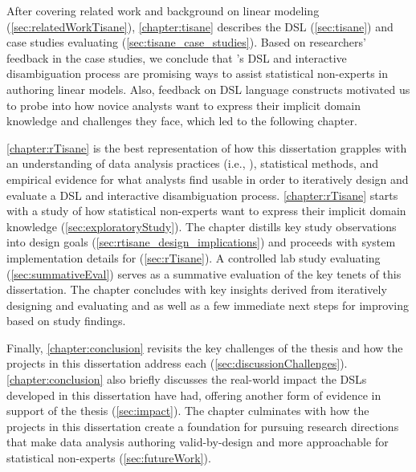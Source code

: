 After covering related work and background on linear modeling
(\autoref{sec:relatedWorkTisane}), \autoref{chapter:tisane} describes the
\tisane DSL (\autoref{sec:tisane}) and case studies evaluating \tisane
(\autoref{sec:tisane_case_studies}). Based on researchers' feedback in the case
studies, we conclude that \tisane's DSL and interactive disambiguation process
are promising ways to assist statistical non-experts in authoring linear models.
Also, feedback on DSL language constructs motivated us to probe into how novice
analysts want to express their implicit domain knowledge and challenges they
face, which led to the following chapter.

\autoref{chapter:rTisane} is the best representation of how this dissertation
grapples with an understanding of data analysis practices (i.e., \hypoForm),
statistical methods, and empirical evidence for what analysts find usable in
order to iteratively design and evaluate a DSL and interactive disambiguation
process. \autoref{chapter:rTisane} starts with a study of how statistical
non-experts want to express their implicit domain knowledge
(\autoref{sec:exploratoryStudy}). The chapter distills key study observations
into design goals (\autoref{sec:rtisane_design_implications}) and proceeds with
system implementation details for \rTisane (\autoref{sec:rTisane}). A controlled
lab study evaluating \rTisane (\autoref{sec:summativeEval}) serves as a
summative evaluation of the key tenets of this dissertation. The chapter
concludes with key insights derived from iteratively designing and evaluating
\tisane and \rTisane as well as a few immediate next steps for improving
\rTisane based on study findings.


Finally, \autoref{chapter:conclusion} revisits the key challenges of the thesis
and how the projects in this dissertation address each
(\autoref{sec:discussionChallenges}). \autoref{chapter:conclusion} also briefly
discusses the real-world impact the DSLs developed in this dissertation have
had, offering another form of evidence in support of the thesis
(\autoref{sec:impact}). The chapter culminates with how the projects in this
dissertation create a foundation for pursuing research directions that make data
analysis authoring valid-by-design and more approachable for statistical
non-experts (\autoref{sec:futureWork}). 

